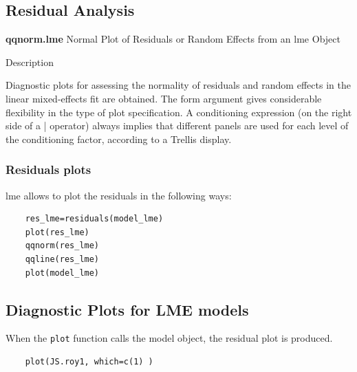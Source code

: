 \subsection{Residual Analysis}


\textbf{qqnorm.lme}
Normal Plot of Residuals or Random Effects from an lme Object

Description

Diagnostic plots for assessing the normality of residuals and random effects in the linear mixed-effects fit are obtained. 
The form argument gives considerable flexibility in the type of plot specification. 
A conditioning expression (on the right side of a | operator) always implies that different panels are used 
for each level of the conditioning factor, according to a Trellis display.


\subsubsection{Residuals plots}

lme allows to plot the residuals in the following ways:

\begin{framed}
	\begin{verbatim}
	res_lme=residuals(model_lme)
	plot(res_lme)
	qqnorm(res_lme)
	qqline(res_lme)
	plot(model_lme)
	\end{verbatim}
\end{framed}



\subsection{Diagnostic Plots for LME models}



When the \texttt{plot} function calls the model object, the residual plot is produced.





\begin{framed}
	\begin{verbatim}
	plot(JS.roy1, which=c(1) )
	\end{verbatim}
\end{framed}


